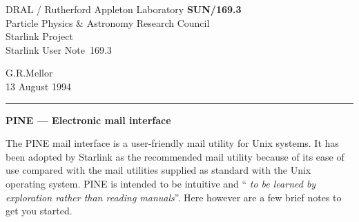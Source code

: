 \pagestyle{myheadings}

\newcommand{\stardoccategory}  {Starlink User Note}
\newcommand{\stardocinitials}  {SUN}
\newcommand{\stardocnumber}    {169.3}
\newcommand{\stardocauthors}   {G.R.Mellor}
\newcommand{\stardocdate}      {13 August 1994}
\newcommand{\stardoctitle}     {PINE --- Electronic mail interface}

\newcommand{\stardocname}{\stardocinitials /\stardocnumber}
\renewcommand{\_}{{\tt\char'137}}     %
\markright{\stardocname}
\setlength{\textwidth}{160mm}
\setlength{\textheight}{230mm}
\setlength{\topmargin}{-2mm}
\setlength{\oddsidemargin}{0mm}
\setlength{\evensidemargin}{0mm}
\setlength{\parindent}{0mm}
\setlength{\parskip}{\medskipamount}
\setlength{\unitlength}{1mm}



\thispagestyle{empty}
DRAL / {\sc Rutherford Appleton Laboratory} \hfill {\bf \stardocname}\\
{\large Particle Physics \& Astronomy Research Council}\\
{\large Starlink Project\\}
{\large \stardoccategory\ \stardocnumber}
\begin{flushright}
\stardocauthors\\
\stardocdate
\end{flushright}
\vspace{-4mm}
\rule{\textwidth}{0.5mm}
\vspace{5mm}
\begin{center}
{\Large\bf \stardoctitle}
\end{center}
\vspace{5mm}


The PINE mail interface is a user-friendly mail utility for Unix systems.
It has been adopted by Starlink as the recommended mail utility because
of its ease of use compared with the mail utilities supplied as standard with
the Unix operating system. PINE is intended to be intuitive and ``{\it
to be learned by exploration rather than reading manuals}''. Here however
are a few brief notes to get you started.

